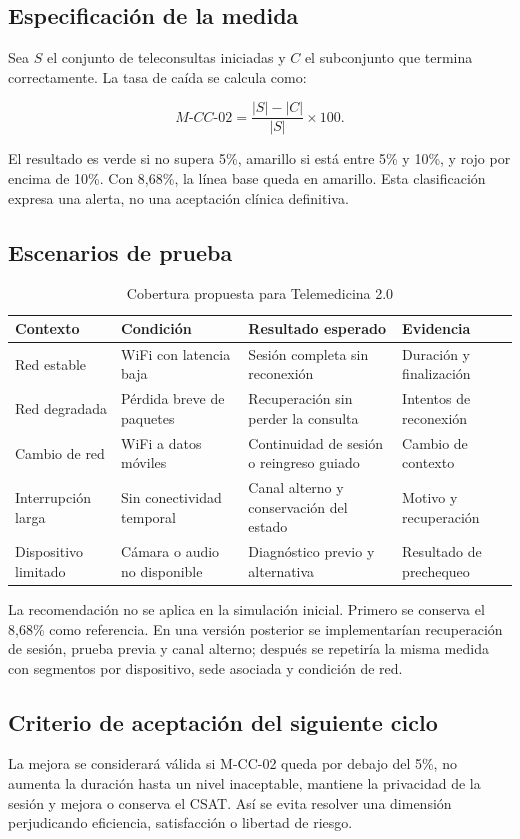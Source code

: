 \subsection{Especificación de la medida}

Sea $S$ el conjunto de teleconsultas iniciadas y $C$ el subconjunto que termina correctamente. La tasa de caída se calcula como:

\begin{equation}
M\text{-}CC\text{-}02 = \frac{|S|-|C|}{|S|}\times 100.
\end{equation}

El resultado es verde si no supera 5\%, amarillo si está entre 5\% y 10\%, y rojo por encima de 10\%. Con 8,68\%, la línea base queda en amarillo. Esta clasificación expresa una alerta, no una aceptación clínica definitiva.

\subsection{Escenarios de prueba}

\begin{table}[H]
\centering
\caption{Cobertura propuesta para Telemedicina 2.0}
\begin{tabularx}{\textwidth}{p{2.6cm}p{2.8cm}YY}
\toprule
Contexto & Condición & Resultado esperado & Evidencia \\
\midrule
Red estable & WiFi con latencia baja & Sesión completa sin reconexión & Duración y finalización \\
Red degradada & Pérdida breve de paquetes & Recuperación sin perder la consulta & Intentos de reconexión \\
Cambio de red & WiFi a datos móviles & Continuidad de sesión o reingreso guiado & Cambio de contexto \\
Interrupción larga & Sin conectividad temporal & Canal alterno y conservación del estado & Motivo y recuperación \\
Dispositivo limitado & Cámara o audio no disponible & Diagnóstico previo y alternativa & Resultado de prechequeo \\
\bottomrule
\end{tabularx}
\end{table}

La recomendación no se aplica en la simulación inicial. Primero se conserva el 8,68\% como referencia. En una versión posterior se implementarían recuperación de sesión, prueba previa y canal alterno; después se repetiría la misma medida con segmentos por dispositivo, sede asociada y condición de red.

\subsection{Criterio de aceptación del siguiente ciclo}

La mejora se considerará válida si M-CC-02 queda por debajo del 5\%, no aumenta la duración hasta un nivel inaceptable, mantiene la privacidad de la sesión y mejora o conserva el CSAT. Así se evita resolver una dimensión perjudicando eficiencia, satisfacción o libertad de riesgo.
